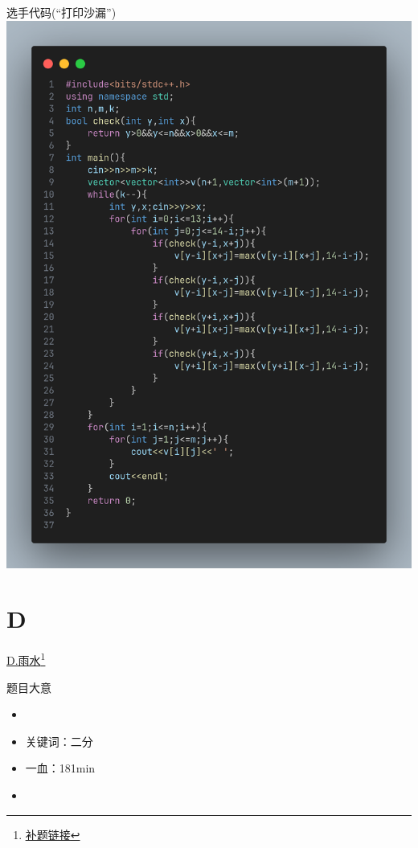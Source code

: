 \documentclass{beamer}
\begin{document}
    \begin{frame}{选手代码(“打印沙漏”)}
        \centering\includegraphics[scale=0.15]{images/std/C1.png}
    \end{frame}
    \section{D}
    \hypertarget{C}{}
    \begin{frame}{\hyperlink{toc}{D.雨水}\footnote{\href{https://acm816.cn/p/239}{\underline{补题链接}}}}
        \begin{block}{题目大意}
            \begin{itemize}
                \item 
                \item 关键词：二分
                \item 一血：181min
            \end{itemize}
        \end{block}
    \end{frame}
    \begin{itemize}
        \item 
    \end{itemize}
\end{document}
